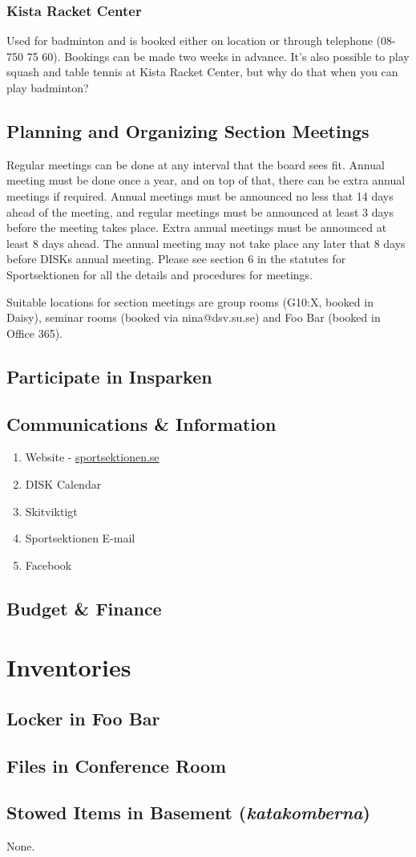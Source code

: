\documentclass[12pt,a4paper]{article}
\begin{document}
			\subsubsection{Kista Racket Center}
			Used for badminton and is booked either on location or through telephone (08-750 75 60). Bookings can be made two weeks in advance. It's also possible to play squash and table tennis at Kista Racket Center, but why do that when you can play badminton?
		\subsection{Planning and Organizing Section Meetings}
		Regular meetings can be done at any interval that the board sees fit. Annual meeting must be done once a year, and on top of that, there can be extra annual meetings if required. Annual meetings must be announced no less that 14 days ahead of the meeting, and regular meetings must be announced at least 3 days before the meeting takes place. Extra annual meetings must be announced at least 8 days ahead. The annual meeting may not take place any later that 8 days before DISKs annual meeting. Please see section 6 in the statutes for Sportsektionen for all the details and procedures for meetings.

		Suitable locations for section meetings are group rooms (G10:X, booked in Daisy), seminar rooms (booked via nina@dsv.su.se) and Foo Bar (booked in Office 365).
		\subsection{Participate in Insparken}
		\subsection{Communications \& Information}
			\begin{enumerate}
				\item Website - \href{http://sportsektionen.se}{sportsektionen.se}
				\item DISK Calendar
				\item Skitviktigt
				\item Sportsektionen E-mail
				\item Facebook
			\end{enumerate}
		\subsection{Budget \& Finance}

	\section{Inventories}
		\subsection{Locker in Foo Bar}
		\subsection{Files in Conference Room}
		\subsection{Stowed Items in Basement (\emph{katakomberna})}
			None.
\end{document}
